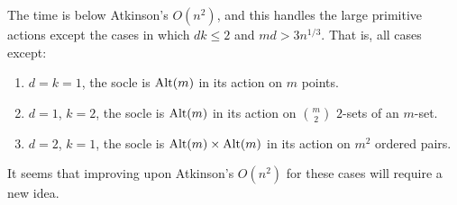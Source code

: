 \documentclass[12pt]{article}
\newcommand{\Alt}{{\rm Alt}}
\begin{document}
The time is below Atkinson's $O(n^2)$, and
this handles the large
primitive actions except the cases in which $dk \leq 2$ and
$md> 3n^{1/3}$.  That is, all cases except:
\begin{enumerate}
\item $d=k=1$, the socle is $\Alt(m)$ in its action on $m$ points.
\item $d=1$, $k=2$, the socle is $\Alt(m)$ in its action on
  $\binom{m}{2}$ $2$-sets of an $m$-set.
\item $d=2$, $k=1$, the socle is
  $\Alt(m)\times\Alt(m)$ in its action on $m^2$ ordered pairs.
\end{enumerate}
It seems that improving upon Atkinson's $O(n^2)$ for these
cases will require a new idea.




\end{document}
